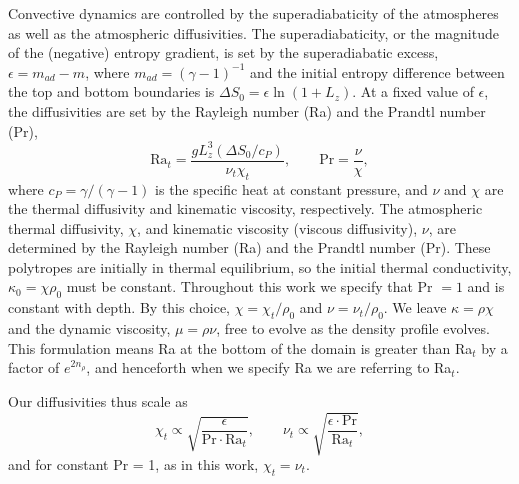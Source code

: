 \documentclass[aps, prl, twocolumn, nofootinbib, groupedaddress, amsfonts, amssymb, amsmath]{revtex4-1}
\begin{document}
Convective dynamics are controlled by the superadiabaticity
of the atmospheres as well as the atmospheric diffusivities.
The superadiabaticity, or the magnitude of the (negative) 
entropy gradient, is set by 
the superadiabatic excess, $\epsilon = m_{ad} - m$, where 
$m_{ad} = (\gamma - 1)^{-1}$ and the initial entropy
difference between the top and bottom boundaries is
$\Delta S_0 = \epsilon\ln (1 + L_z)$.  At a fixed value of
$\epsilon$, the diffusivities are set by the
Rayleigh number (Ra) and the Prandtl number (Pr),
\begin{equation}
\text{Ra}_{t} = \frac{g L_z^3 (\Delta S_0 / c_P)}{\nu_t\chi_t},
\qquad
\text{Pr} = \frac{\nu}{\chi},
\end{equation}
where $c_P = \gamma/(\gamma-1)$ is the specific heat at
constant pressure, and $\nu$ and $\chi$ are the thermal diffusivity and
kinematic viscosity, respectively.
The atmospheric thermal diffusivity, $\chi$,
and kinematic viscosity (viscous diffusivity), $\nu$,
are determined by the Rayleigh number (Ra) and the Prandtl
number (Pr).  These polytropes are initially in
thermal equilibrium, so the initial thermal
conductivity, $\kappa_0 = \chi \rho_0$ must be
constant.  Throughout this work we specify
that Pr $= 1$ and is constant with depth.  By this
choice, $\chi = \chi_t / \rho_0$ and $\nu = \nu_t / \rho_0$.
We leave $\kappa = \rho\chi$ and the dynamic viscosity,
$\mu = \rho\nu$, free to evolve as the density 
profile evolves.  This formulation 
means Ra at the bottom of the domain is greater than
Ra$_t$ by a factor of $e^{2n_\rho}$, and henceforth
when we specify Ra we are referring to Ra$_t$.  

Our diffusivities thus scale as
\begin{equation}
\chi_t \propto \sqrt{\frac{\epsilon}{\text{Pr}\cdot\text{Ra}_t}}, \qquad
\nu_t \propto \sqrt{\frac{\epsilon\cdot\text{Pr}}{\text{Ra}_t}},
\end{equation}
and for constant Pr = 1, as in this work, $\chi_t = \nu_t$.
\end{document}
